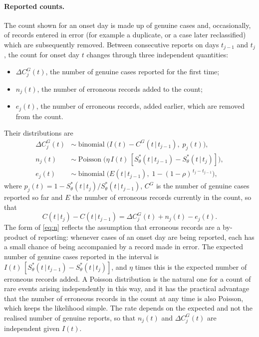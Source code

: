 \documentclass[11pt,a4paper]{article}
\newcommand{\given}{\,|\,}
\newcommand{\bin}{\operatorname{binomial}}
\newcommand{\pois}{\operatorname{Poisson}}
\begin{document}
\paragraph{Reported counts.} The count shown for an onset day is made up of
genuine cases and, occasionally, of records entered in error (for example a
duplicate, or a case later reclassified) which are subsequently removed.
Between consecutive reports on days $t_{j-1}$ and $t_j$, the count for onset
day $t$ changes through three independent quantities:
\begin{itemize}[itemsep=2pt]
\item $\Delta C^{G}_j(t)$, the number of genuine cases reported for the first time;
\item $n_j(t)$, the number of erroneous records added to the count;
\item $e_j(t)$, the number of erroneous records, added earlier, which are
removed from the count.
\end{itemize}
Their distributions are
\begin{align}
\Delta C^{G}_j(t) &\sim \bin\bigl(I(t) - C^{G}(t\given t_{j-1}),\; p_j(t)\bigr), \label{eq:d}\\
n_j(t) &\sim \pois\bigl(\eta\,I(t)\,[S^{*}_\theta(t\given t_{j-1}) - S^{*}_\theta(t\given t_j)]\bigr), \label{eq:n}\\
e_j(t) &\sim \bin\bigl(E(t\given t_{j-1}),\; 1-(1-\rho)^{\,t_j-t_{j-1}}\bigr), \label{eq:m}
\end{align}
where $p_j(t)=1-S^{*}_\theta(t\given t_j)/S^{*}_\theta(t\given t_{j-1})$,
$C^{G}$ is the number of genuine cases reported so far and $E$ the number of
erroneous records currently in the count, so that
\begin{equation}\label{eq:deltaC}
C(t\given t_j)-C(t\given t_{j-1}) = \Delta C^{G}_j(t)+n_j(t)-e_j(t).
\end{equation}
The form of \eqref{eq:n} reflects the assumption that erroneous records are a
by-product of reporting: whenever cases of an onset day are being reported,
each has a small chance of being accompanied by a record made in error. The
expected number of genuine cases reported in the interval is
$I(t)\,[S^{*}_\theta(t\given t_{j-1})-S^{*}_\theta(t\given t_j)]$, and
$\eta$ times this is the expected number of erroneous records added. A
Poisson distribution is the natural one for a count of rare events arising
independently in this way, and it has the practical advantage that the number
of erroneous records in the count at any time is also Poisson, which keeps
the likelihood simple. The rate depends on the expected and not the realised
number of genuine reports, so that $n_j(t)$ and $\Delta C^{G}_j(t)$ are independent
given $I(t)$.
\end{document}
